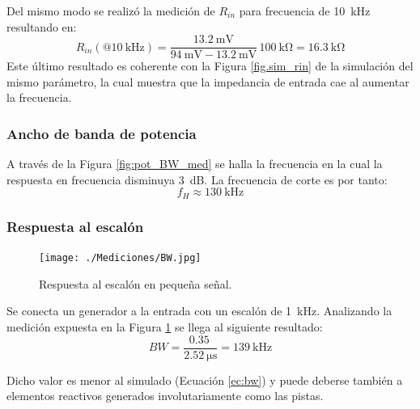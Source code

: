 		Del mismo modo se realizó la medición de $R_{in}$ para frecuencia de \SI{10}{\kHz} resultando en:
		\begin{equation*}
			R_{in}(@\SI{10}{\kHz})  = \frac{\SI{13.2}{\mV}}{\SI{94}{\mV} - \SI{13.2}{\mV}} \, \SI{100}{\kilo\ohm} = \boxed{\SI{16.3}{\kilo\ohm}}
		\end{equation*}
		Este último resultado es coherente con la Figura \ref{fig.sim_rin} de la simulación del mismo parámetro, la cual muestra que la impedancia de entrada cae al aumentar la frecuencia.
		\subsubsection{Ancho de banda de potencia}

		
		A través de la Figura \ref{fig:pot_BW_med} se halla la frecuencia en la cual la respuesta en frecuencia disminuya \SI{3}{\dB}. La frecuencia de corte es por tanto:
		\begin{equation*}
			\boxed{f_H \approx \SI{130}{\kHz}}
		\end{equation*}

		\subsubsection{Respuesta al escalón}
		\begin{figure}[h!]
			\centering
			\texttt{[image: ./Mediciones/BW.jpg]}
			\caption{Respuesta al escalón en pequeña señal.}
			\label{fig:escalon_ss}
		\end{figure}


		Se conecta un generador a la entrada con un escalón de \SI{1}{\kHz}. Analizando la medición expuesta en la Figura \ref{fig:escalon_ss} se llega al siguiente resultado:
		\begin{equation*}
			\boxed{BW = \frac{\SI{0.35}{}}{\SI{2.52}{\micro\second}} = \SI{139}{\kHz}}
		\end{equation*}

		Dicho valor es menor al simulado (Ecuación \eqref{ec:bw}) y puede deberse también a elementos reactivos generados involutariamente como las pistas.

